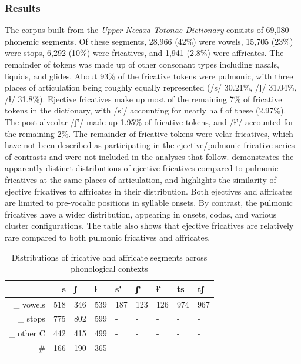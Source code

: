 \documentclass[output=paper,colorlinks,citecolor=brown]{langscibook}
\begin{document}
\subsubsection{Results}\label{subsubsection:collocationResults}
The corpus built from the \textit{Upper Necaxa Totonac Dictionary} consists of 69,080 phonemic segments. Of these segments, 28,966 (42\%) were vowels, 15,705 (23\%) were stops, 6,292 (10\%) were fricatives, and 1,941 (2.8\%) were affricates. The remainder of tokens was made up of other consonant types including nasals, liquids, and glides. About 93\% of the fricative tokens were pulmonic, with three places of articulation being roughly equally represented ({/s/} 30.21\%, /ʃ/ 31.04\%, \mbox{/{ɬ}/} 31.8\%). Ejective fricatives make up most of the remaining 7\% of fricative tokens in the dictionary, with {/s'/} accounting for nearly half of these (2.97\%). The post-alveolar {/ʃ'/} made up 1.95\% of fricative tokens, and {/{ɬ}'/} accounted for the remaining 2\%. The remainder of fricative tokens were velar fricatives, which have not been described as participating in the ejective/pulmonic fricative series of contrasts and were not included in the analyses that follow.  demonstrates the apparently distinct distributions of ejective fricatives compared to pulmonic fricatives at the same places of articulation, and highlights the similarity of ejective fricatives to affricates in their distribution. Both ejectives and affricates are limited to pre-vocalic positions in syllable onsets. By contrast, the pulmonic fricatives have a wider distribution, appearing in onsets, codas, and various cluster configurations. The table also shows that ejective fricatives are relatively rare compared to both pulmonic fricatives and affricates.

\begin{table}
    \caption[]{Distributions of fricative and affricate segments across phonological contexts}
    \label{tab:fricdist}
    \begin{tabularx}{\textwidth}{r rYY YYY YY}
    \lsptoprule
    & s & {ʃ} & ɬ & s' & {ʃ'} & ɬ' & {ts} & {tʃ} \\
    \midrule
    \_ vowels & 518    & 346  & 539   & 187   & 123  & 126 &974 & 967\\
    \_ stops  & 775 & 802   & 599   &-&-&-&-&-\\
    \_ other C    & 442 & 415   & 499   &-&-&-&-&-\\
    \_\#  & 166 & 190   &   365 &-&-&-&-&-\\
    \lspbottomrule
    \end{tabularx}
\end{table}
\end{document}
